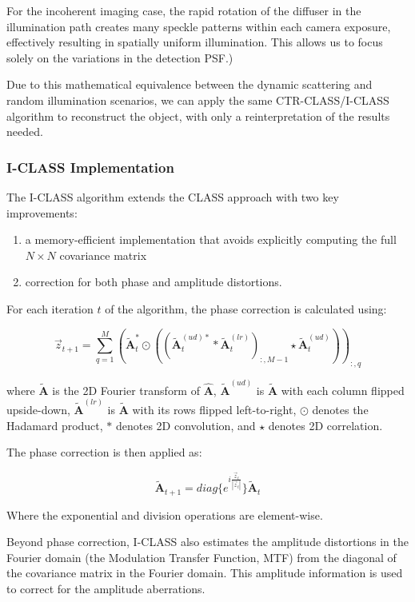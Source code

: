 \documentclass[12pt]{article}
\newenvironment{ourresponse}
    {\begin{tcolorbox}[width=\linewidth,breakable,enhanced,colback=gray!5,colframe=responsecolor!50,title=Response,left=5pt,right=5pt]}
    {\end{tcolorbox}}
\begin{document}
\begin{ourresponse}
For the incoherent imaging case, the rapid rotation of the diffuser in the illumination path creates many speckle patterns within each camera exposure, effectively resulting in spatially uniform illumination. This allows us to focus solely on the variations in the detection PSF.)

Due to this mathematical equivalence between the dynamic scattering and random illumination scenarios, we can apply the same CTR-CLASS/I-CLASS algorithm to reconstruct the object, with only a reinterpretation of the results needed.

\subsubsection*{I-CLASS Implementation}

The I-CLASS algorithm extends the CLASS approach with two key improvements:
\begin{enumerate}
    \item a memory-efficient implementation that avoids explicitly computing the full $N \times N$ covariance matrix
    \item correction for both phase and amplitude distortions.
\end{enumerate}
For each iteration $t$ of the algorithm, the phase correction is calculated using:

\begin{equation}
\vec{z}_{t+1} = \sum_{q=1}^{M} (\tilde{\mathbf{A}}_t^* \odot ((\tilde{\mathbf{A}}_t^{(ud)*} * \tilde{\mathbf{A}}_t^{(lr)})_{:,M-1} \star \tilde{\mathbf{A}}_t^{(ud)}))_{:,q}
\end{equation}

where $\tilde{\mathbf{A}}$ is the 2D Fourier transform of $\hat{\mathbf{A}}$, $\tilde{\mathbf{A}}^{(ud)}$ is $\tilde{\mathbf{A}}$ with each column flipped upside-down, $\tilde{\mathbf{A}}^{(lr)}$ is $\tilde{\mathbf{A}}$ with its rows flipped left-to-right, $\odot$ denotes the Hadamard product, $*$ denotes 2D convolution, and $\star$ denotes 2D correlation.

The phase correction is then applied as:

\begin{equation}
\tilde{\mathbf{A}}_{t+1} = diag\{e^{i\frac{\vec{z}_t}{|\vec{z}_t|}}\} \tilde{\mathbf{A}}_t
\end{equation}

Where the exponential and division operations are element-wise.

Beyond phase correction, I-CLASS also estimates the amplitude distortions in the Fourier domain (the Modulation Transfer Function, MTF) from the diagonal of the covariance matrix in the Fourier domain. This amplitude information is used to correct for the amplitude aberrations.


\end{ourresponse}
\end{document}
